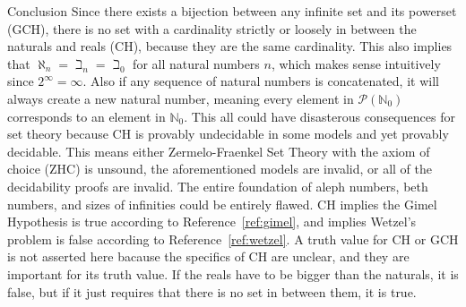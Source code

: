 \documentclass[12pt]{article}
\begin{document}
\begin{section}{Conclusion}\label{sec:conclusion}
	Since there exists a bijection between any infinite set and its powerset (GCH), there is no
	set with a cardinality strictly or loosely in between the naturals and reals (CH), because
	they are the same cardinality. This also implies that $\aleph_n=\beth_n=\beth_0$ for all
	natural numbers $n$, which makes sense intuitively since $2^\infty=\infty$. Also if any
	sequence of natural numbers is concatenated, it will always create a new natural number,
	meaning every element in $\mathcal P(\mathbb N_0)$ corresponds to an element in
	$\mathbb N_0$. This all could have disasterous consequences for set theory because CH is
	provably undecidable in some models and yet provably decidable. This means either
	Zermelo-Fraenkel Set Theory with the axiom of choice (ZHC) is unsound, the aforementioned
	models are invalid, or all of the decidability proofs are invalid. The entire foundation of
	aleph numbers, beth numbers, and sizes of infinities could be entirely flawed. CH implies
	the Gimel Hypothesis is true according to Reference~\ref{ref:gimel}, and implies Wetzel's
	problem is false according to Reference~\ref{ref:wetzel}. A truth value for CH or GCH is
	not asserted here bacause the specifics of CH are unclear, and they are important for its
	truth value. If the reals have to be bigger than the naturals, it is false, but if it just
	requires that there is no set in between them, it is true.
\end{section}
\end{document}
